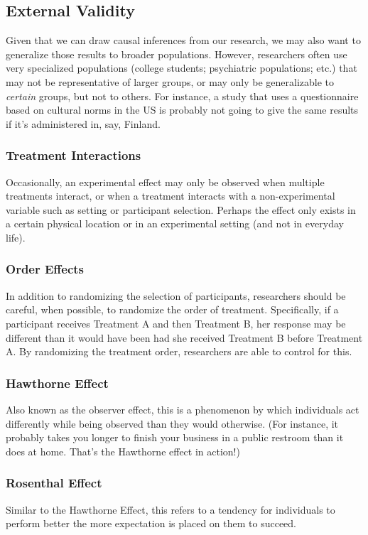 \subsection{External Validity} 

Given that we can draw causal inferences from our research, we may also want to generalize those results to broader populations. However, researchers often use very specialized populations (college students; psychiatric populations; etc.) that may not be representative of larger groups, or may only be generalizable to \textit{certain} groups, but not to others. For instance, a study that uses a questionnaire based on cultural norms in the US is probably not going to give the same results if it's administered in, say, Finland.

\subsubsection{Treatment Interactions}
Occasionally, an experimental effect may only be observed when multiple treatments interact, or when a treatment interacts with a non-experimental variable such as setting or participant selection. Perhaps the effect only exists in a certain physical location or in an experimental setting (and not in everyday life).

\subsubsection{Order Effects}
In addition to randomizing the selection of participants, researchers should be careful, when possible, to randomize the order of treatment. Specifically, if a participant receives Treatment A and then Treatment B, her response may be different than it would have been had she received Treatment B before Treatment A. By randomizing the treatment order, researchers are able to control for this.

\subsubsection{Hawthorne Effect}
Also known as the observer effect, this is a phenomenon by which individuals act differently while being observed than they would otherwise. (For instance, it probably takes you longer to finish your business in a public restroom than it does at home. That's the Hawthorne effect in action!)

\subsubsection{Rosenthal Effect}
Similar to the Hawthorne Effect, this refers to a tendency for individuals to perform better the more expectation is placed on them to succeed.

